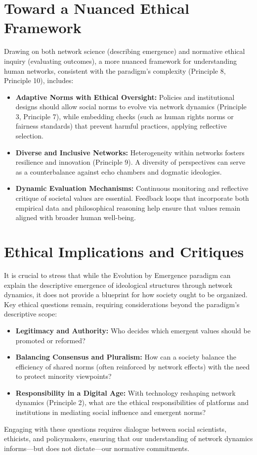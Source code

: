 \documentclass[12pt,openany]{book}
\begin{document}
\section{Toward a Nuanced Ethical Framework}
Drawing on both network science (describing emergence) and normative ethical inquiry (evaluating outcomes), a more nuanced framework for understanding human networks, consistent with the paradigm's complexity (Principle 8, Principle 10), includes:
\begin{itemize}
    \item \textbf{Adaptive Norms with Ethical Oversight:} Policies and institutional designs should allow social norms to evolve via network dynamics (Principle 3, Principle 7), while embedding checks (such as human rights norms or fairness standards) that prevent harmful practices, applying reflective selection.
    \item \textbf{Diverse and Inclusive Networks:} Heterogeneity within networks fosters resilience and innovation (Principle 9). A diversity of perspectives can serve as a counterbalance against echo chambers and dogmatic ideologies.
    \item \textbf{Dynamic Evaluation Mechanisms:} Continuous monitoring and reflective critique of societal values are essential. Feedback loops that incorporate both empirical data and philosophical reasoning help ensure that values remain aligned with broader human well-being.
\end{itemize} %

\section{Ethical Implications and Critiques}
It is crucial to stress that while the Evolution by Emergence paradigm can explain the descriptive emergence of ideological structures through network dynamics, it does not provide a blueprint for how society ought to be organized. Key ethical questions remain, requiring considerations beyond the paradigm's descriptive scope:
\begin{itemize}
    \item \textbf{Legitimacy and Authority:} Who decides which emergent values should be promoted or reformed?
    \item \textbf{Balancing Consensus and Pluralism:} How can a society balance the efficiency of shared norms (often reinforced by network effects) with the need to protect minority viewpoints?
    \item \textbf{Responsibility in a Digital Age:} With technology reshaping network dynamics (Principle 2), what are the ethical responsibilities of platforms and institutions in mediating social influence and emergent norms?
\end{itemize}
Engaging with these questions requires dialogue between social scientists, ethicists, and policymakers, ensuring that our understanding of network dynamics informs—but does not dictate—our normative commitments. %
\end{document}

